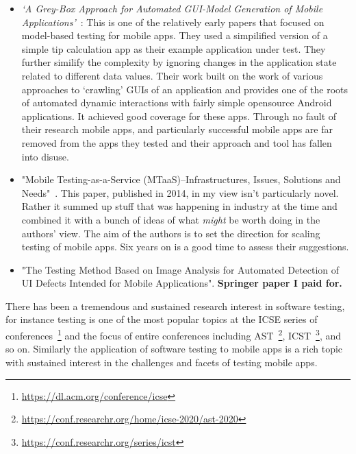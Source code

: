 \begin{itemize}
    \item \emph{`A Grey-Box Approach for Automated GUI-Model Generation of Mobile Applications'}~\citep{Yang_Prasad_Xie_2013_grey_box_automated_gui_model_generation_for_mobile_apps}: This is one of the relatively early papers that focused on model-based testing for mobile apps. They used a simpilified version of a simple tip calculation app as their example application under test. They further similify the complexity by ignoring changes in the application state related to different data values. Their work built on the work of various approaches to `crawling' GUIs of an application and provides one of the roots of automated dynamic interactions with fairly simple opensource Android applications. It achieved good coverage for these apps. Through no fault of their research mobile apps, and particularly successful mobile apps are far removed from the apps they tested and their approach and tool has fallen into disuse. %
    
    \item "Mobile Testing-as-a-Service (MTaaS)--Infrastructures, Issues, Solutions and Needs"~\cite{gao2014mobile}. This paper, published in 2014, in my view isn't particularly novel. Rather it summed up stuff that was happening in industry at the time and combined it with a bunch of ideas of what \emph{might} be worth doing in the authors' view. The aim of the authors is to set the direction for scaling testing of mobile apps. Six years on is a good time to assess their suggestions.
    
    \item "The Testing Method Based on Image Analysis for Automated Detection of UI Defects Intended for Mobile Applications". \textbf{Springer paper I paid for.}
\end{itemize}

There has been a tremendous and sustained research interest in software testing, for instance testing is one of the most popular topics at the ICSE series of conferences~\footnote{\url{https://dl.acm.org/conference/icse}} and the focus of entire conferences including AST~\footnote{\url{https://conf.researchr.org/home/icse-2020/ast-2020}}, ICST~\footnote{\url{https://conf.researchr.org/series/icst}}, and so on. Similarly the application of software testing to mobile apps is a rich topic with sustained interest in the challenges and facets of testing mobile apps.

